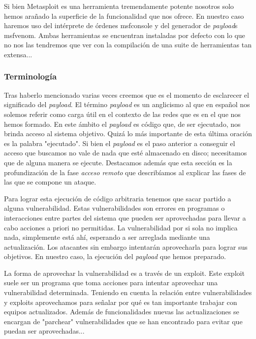 \documentclass[12pt]{article}
\newcommand{\newpar} {
    \vskip 1cm
}
\begin{document}
                \newpar

                Si bien Metasploit es una herramienta tremendamente potente nosotros solo hemos arañado la superficie de la funcionalidad que nos ofrece. En nuestro caso haremos uso del intérprete de órdenes msfconsole y del generador de \textit{payload}s msfvenom. Ambas herramientas se encuentran instaladas por defecto con lo que no nos las tendremos que ver con la compilación de una suite de herramientas tan extensa...

            \subsubsection{Terminología}
                Tras haberlo mencionado varias veces creemos que es el momento de esclarecer el significado del \textit{payload}. El término \textit{payload} es un anglicismo al que en español nos solemos referir como carga útil en el contexto de las redes que es en el que nos hemos formado. En este ámbito el \textit{payload} es código que, de ser ejecutado, nos brinda acceso al sistema objetivo. Quizá lo más importante de esta última oración es la palabra "ejecutado". Si bien el \textit{payload} es el paso anterior a conseguir el acceso que buscamos no vale de nada que esté almacenado en disco; necesitamos que de alguna manera se ejecute. Destacamos además que esta sección es la profundización de la fase \textit{acceso remoto} que describíamos al explicar las fases de las que se compone un ataque.

                \newpar

                Para lograr esta ejecución de código arbitraria tenemos que sacar partido a alguna vulnerabilidad. Estas vulnerabilidades son errores en programas o interacciones entre partes del sistema que pueden ser aprovechadas para llevar a cabo acciones a priori no permitidas. La vulnerabilidad por si sola no implica nada, simplemente está ahí, esperando a ser arreglada mediante una actualización. Los atacantes sin embargo intentarán aprovecharla para lograr sus objetivos. En nuestro caso, la ejecución del \textit{payload} que hemos preparado.

                \newpar

                La forma de aprovechar la vulnerabilidad es a través de un exploit. Este exploit suele ser un programa que toma acciones para intentar aprovechar una vulnerabilidad determinada. Teniendo en cuenta la relación entre vulnerabilidades y exploits aprovechamos para señalar por qué es tan importante trabajar con equipos actualizados. Además de funcionalidades nuevas las actualizaciones se encargan de "parchear" vulnerabilidades que se han encontrado para evitar que puedan ser aprovechadas...
\end{document}
